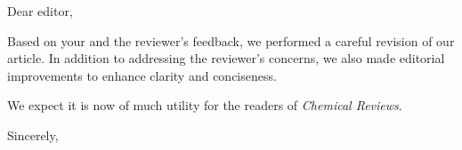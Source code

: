 \documentclass[unijena]{scrlttr2}
\begin{document}
\begin{letter}{%
\hfill
}

\opening{Dear editor,}

Based on your and the reviewer's feedback, we performed a careful revision of our article. 
In addition to addressing the reviewer's concerns, we also made editorial improvements to enhance clarity and conciseness. 

We expect it is now of much utility for the readers of \textit{Chemical Reviews}.

\closing{Sincerely,\vspace{3em}}




\end{letter}
\end{document}

